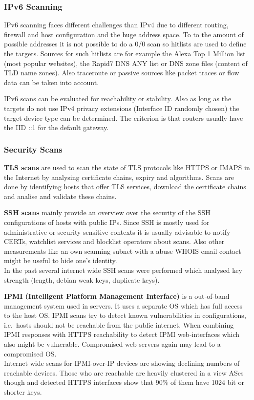 \subsubsection*{IPv6 Scanning}
IPv6 scanning faces different challenges than IPv4 due to different routing, firewall and host configuration and the huge address space.
To to the amount of possible addresses it is not possible to do a 0/0 scan so hitlists are used to define the targets.
Sources for such hitlists are for example the Alexa Top 1 Million list (most popular websites), the Rapid7 DNS ANY list or DNS zone files (content of TLD name zones).
Also traceroute or passive sources like packet traces or flow data can be taken into account.\\
\vspace{4pt}

IPv6 scans can be evaluated for reachability or stability.
Also as long as the targets do not use IPv4 privacy extensions (Interface ID randomly chosen) the target device type can be determined.
The criterion is that routers usually have the IID ::1 for the default gateway.

\subsubsection*{Security Scans}
\textbf{TLS scans} are used to scan the state of TLS protocols like HTTPS or IMAPS in the Internet by analysing certificate chains, expiry and algorithms.
Scans are done by identifying hosts that offer TLS services, download the certificate chains and analise and validate these chains.\\
\vspace{4pt}

\textbf{SSH scans} mainly provide an overview over the security of the SSH configurations of hosts with public IPs.
Since SSH is mostly used for administrative or security sensitive contexts it is usually advisable to notify CERTs, watchlist services and blocklist operators about scans.
Also other measurements like an own scanning subnet with a abuse WHOIS email contact might be useful to hide one's identity.\\
In the past several internet wide SSH scans were performed which analysed key strength (length, debian weak keys, duplicate keys).\\
\vspace{4pt}

\textbf{IPMI (Intelligent Platform Management Interface)} is a out-of-band management system used in servers.
It uses a separate OS which has full access to the host OS\@.
IPMI scans try to detect known vulnerabilities in configurations, i.e.\ hosts should not be reachable from the public internet.
When combining IPMI responses with HTTPS reachability to detect IPMI web-interfaces which also might be vulnerable.
Compromised web servers again may lead to a compromised OS.\\
Internet wide scans for IPMI-over-IP devices are showing declining numbers of reachable devices.
Those who are reachable are heavily clustered in a view ASes though and detected HTTPS interfaces show that 90\% of them have 1024 bit or shorter keys.\\

